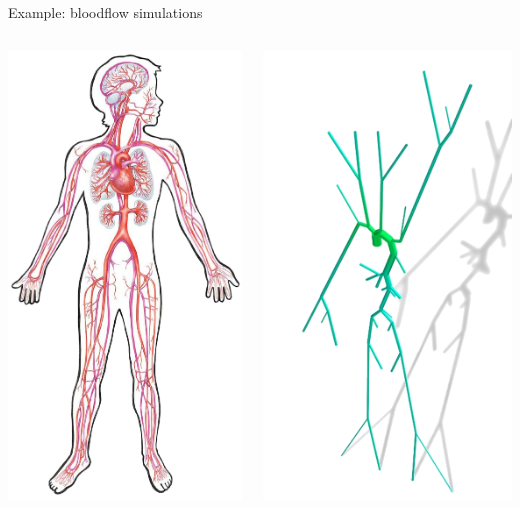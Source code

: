 \documentclass{beamer}
\begin{document}
\begin{frame}[fragile]{Example: bloodflow simulations}{}
    \begin{columns}
        \begin{center}
    \includegraphics[width=.6\textwidth]{ntnu/arterialHumanPicture.png}
        \end{center}
        \begin{center}
    \includegraphics[width=.6\textwidth]{ntnu/arterialTreeMascot3D.png}

\end{center}
\end{columns}
\end{frame}
\end{document}
